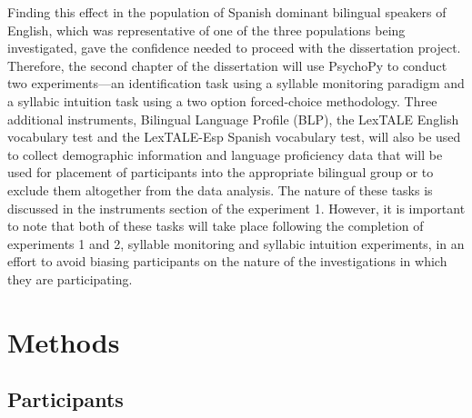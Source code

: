 Finding this effect in the population of Spanish dominant bilingual speakers of English, which was representative of one of the three populations being investigated, gave the confidence needed to proceed with the dissertation project. Therefore, the second chapter of the dissertation will use PsychoPy to conduct two experiments—an identification task using a syllable monitoring paradigm and a syllabic intuition task using a two option forced-choice methodology. Three additional instruments, Bilingual Language Profile (BLP), the LexTALE English vocabulary test and the LexTALE-Esp Spanish vocabulary test, will also be used to collect demographic information and language proficiency data that will be used for placement of participants into the appropriate bilingual group or to exclude them altogether from the data analysis. The nature of these tasks is discussed in the instruments section of the experiment 1. However, it is important to note that both of these tasks will take place following the completion of experiments 1 and 2, syllable monitoring and syllabic intuition experiments, in an effort to avoid biasing participants on the nature of the investigations in which they are participating.




\section{Methods}


\subsection{Participants}

